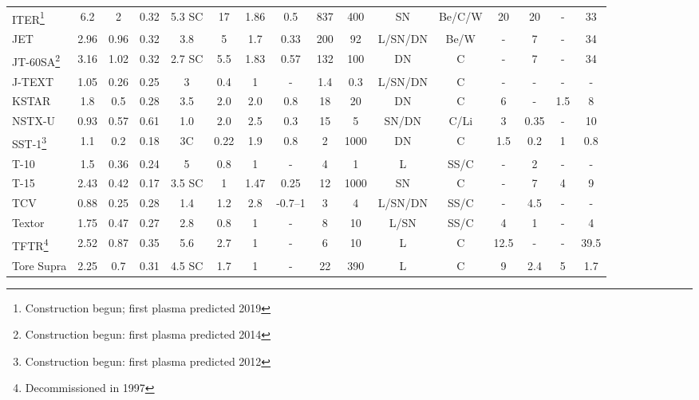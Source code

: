 \begin{sidewaystable}[ht]
\begin{tabular}{l c c c c c c c c c c c c c c c}
    ITER\footnote{\scriptsize Construction begun; first plasma predicted 2019} \T\B&  6.2 & 2 & 0.32 & 5.3 SC & 17 & 1.86 & 0.5 & 837 & 400 & SN & Be/C/W & 20 & 20 & - & 33\\

    \rowcolor[gray]{0.9}
    JET     \T\B& 2.96 & 0.96 & 0.32 & 3.8 & 5  & 1.7 & 0.33 &200 & 92& L/SN/DN& Be/W&- &7 & -&34\\    

    JT-60SA\footnote{\scriptsize Construction begun: first plasma predicted 2014}\T\B& 3.16& 1.02 & 0.32 & 2.7 SC& 5.5&1.83 & 0.57& 132& 100 & DN & C & -& 7& -&34\\

    \rowcolor[gray]{0.9}
    J-TEXT  \T\B& 1.05 & 0.26 & 0.25 & 3& 0.4 &1 &- &1.4 &0.3 & L/SN/DN &C &- & -&- &-\\ %

    KSTAR   \T\B&  1.8 & 0.5 & 0.28 & 3.5 & 2.0  & 2.0 & 0.8 &18 & 20 & DN & C & 6 & - & 1.5 & 8\\    

    \rowcolor[gray]{0.9}
    NSTX-U  \T\B&  0.93 & 0.57 & 0.61 & 1.0 & 2.0  & 2.5 & 0.3 & 15 & 5 & SN/DN & C/Li & 3  & 0.35 & - & 10\\    

    SST-1\footnote{\scriptsize Construction begun: first plasma predicted 2012} \T\B&  1.1 & 0.2 & 0.18 & 3C& 0.22 & 1.9& 0.8&2 & 1000 & DN & C & 1.5 & 0.2 & 1 & 0.8\\
    
    \rowcolor[gray]{0.9}
    T-10    \T\B&  1.5 & 0.36 & 0.24 & 5& 0.8 & 1& - &4 &1 &L & SS/C & - & 2 & - & -\\ %

    T-15    \T\B& 2.43 & 0.42 & 0.17 & 3.5 SC &1 & 1.47& 0.25& 12 & 1000& SN & C & -& 7& 4&9\\ %

    \rowcolor[gray]{0.9}
    TCV     \T\B& 0.88 & 0.25 & 0.28 & 1.4 & 1.2  & 2.8 & -0.7--1 & 3 & 4 & L/SN/DN & SS/C & - & 4.5 & - & - \\

    Textor \T\B&  1.75 & 0.47 & 0.27 &2.8 &0.8 & 1& -&8 & 10&L/SN & SS/C & 4& 1& -&4\\

    \rowcolor[gray]{0.9}
    TFTR\footnote{\scriptsize Decommissioned in 1997}  \T\B&  2.52 & 0.87 & 0.35 & 5.6 &2.7  &1 & -&6 & 10 &L & C & 12.5 & - & - &39.5\\

    Tore Supra \T\B& 2.25 & 0.7 & 0.31 & 4.5 SC & 1.7 &1 & -&22 & 390 & L& C & 9 & 2.4 & 5 &1.7\\
    \hline
  \end{tabular}
\end{sidewaystable}


